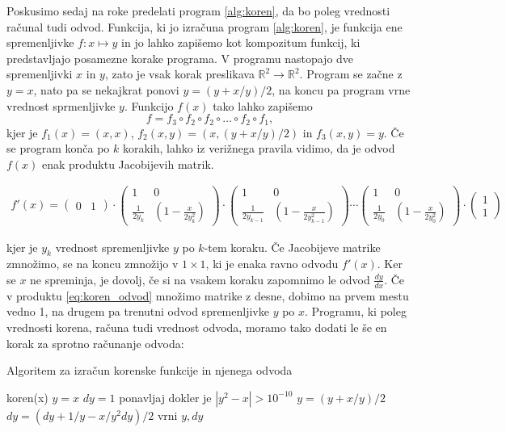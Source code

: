 \documentclass[12pt,slovene]{article}
\begin{document}
Poskusimo sedaj na roke predelati program \ref{alg:koren}, da bo poleg vrednosti računal tudi odvod. Funkcija, ki jo izračuna program \ref{alg:koren}, je funkcija ene spremenljivke $f:x\mapsto y$ in jo lahko zapišemo kot kompozitum funkcij, ki predstavljajo posamezne korake programa. V programu nastopajo dve spremenljivki $x$ in $y$, zato je vsak korak preslikava $\mathbb{R}^2\to \mathbb{R}^2$. Program se začne z $y=x$, nato pa se nekajkrat ponovi $y=(y + x/y)/2$, na koncu pa program vrne vrednost sprmenljivke $y$. Funkcijo $f(x)$ tako lahko zapišemo 
$$
f = f_3\circ f_2\circ f_2\circ\ldots\circ f_2\circ f_1,
$$
kjer je $f_1(x) = (x, x)$, $f_2(x, y) = (x, (y + x/y)/2)$ in $f_3(x, y) = y$. 
Če se program konča po $k$ korakih, lahko iz verižnega pravila vidimo, da je odvod $f(x)$ enak produktu Jacobijevih matrik.

\begin{multline}\label{eq:koren_odvod}
f'(x) = \begin{pmatrix}
    0 & 1
\end{pmatrix}\cdot \begin{pmatrix}
    1 & 0\\
    \frac{1}{2y_k} & (1 - \frac{x}{2y_k^2})
\end{pmatrix}\cdot \begin{pmatrix}
    1 & 0\\
    \frac{1}{2y_{k-1}} & (1 - \frac{x}{2y_{k-1}^2})
\end{pmatrix}\cdots \begin{pmatrix}
    1 & 0\\
    \frac{1}{2y_0} & (1 - \frac{x}{2y_0^2})
\end{pmatrix}\cdot \begin{pmatrix}
    1\\
    1
\end{pmatrix}
\end{multline}

kjer je $y_k$ vrednost spremenljivke $y$ po $k$-tem koraku. Če Jacobijeve matrike zmnožimo, se na koncu zmnožijo v $1\times 1$, ki je enaka ravno odvodu $f'(x)$. Ker se $x$ ne spreminja, je dovolj, če si na vsakem koraku zapomnimo le odvod $\frac{dy}{dx}$. Če v produktu \eqref{eq:koren_odvod} množimo matrike z desne, dobimo na prvem mestu vedno 1, na drugem pa trenutni odvod spremenljivke $y$ po $x$. Programu, ki poleg vrednosti korena, računa tudi vrednost odvoda, moramo tako dodati le še en korak za sprotno računanje odvoda:

\begin{algorithm}[H]
\caption{Algoritem za izračun korenske funkcije in njenega odvoda}\label{alg:koren_odvod}
\begin{algorithmic}\State
koren(x)
\State\quad $y=x$
\State\quad $dy=1$
\State\quad ponavljaj dokler je $|y^2 - x|>10^{-10}$
\State\quad\quad $y = (y + x/y)/2$
\State\quad\quad $dy = (dy + 1/y - x/y^2dy)/2$
\State vrni $y, dy$
\end{algorithmic}
\end{algorithm}
\end{document}
